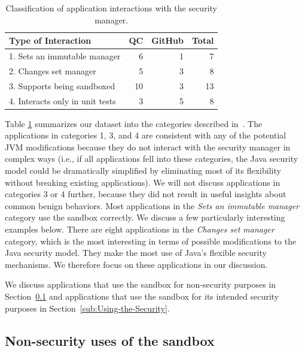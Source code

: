 \documentclass{sig-alternate-05-2015}
\begin{document}
\begin{table}
\caption{Classification of application
  interactions \label{tab:Classification-of-Application}
with the security manager.}
\begin{tabular}{lrrr}
\toprule 
Type of Interaction & QC & GitHub & Total\tabularnewline
\midrule
1. Sets an immutable manager & 6 & 1 & 7\tabularnewline
2. Changes set manager & 5 & 3 & 8\tabularnewline
3. Supports being sandboxed & 10 & 3 & 13\tabularnewline
4. Interacts only in unit tests & 3 & 5 & 8\tabularnewline
\bottomrule
\end{tabular}
\end{table}
Table \ref{tab:Classification-of-Application} summarizes our dataset into the categories described
in~. The applications in categories 1, 3, and 4 
are consistent with any of the potential JVM
modifications because they do not interact with the
security manager in complex ways (i.e., if all applications fell into these
categories, the Java security model could be dramatically simplified by
eliminating most of its flexibility without breaking existing
applications).   We will
not discuss applications in categories 3 or 4 further, because they did not
result in useful insights about common benign 
behaviors. Most applications in the \emph{Sets an immutable
  manager} category use the sandbox correctly.  We discuss a few particularly interesting examples below. 
%
There are eight applications in the \emph{Changes set manager} category, which
is the most interesting in terms of possible modifications to the Java security
model.  
They make the most use of Java's flexible security
mechanisms.  We therefore focus   
on these applications in our discussion. 

We discuss applications that use the sandbox for
non-security purposes in Section~\ref{sub:Non-security-uses-of}
and applications that use the sandbox for its intended security purposes in
Section~\ref{sub:Using-the-Security}.

\subsection{Non-security uses of the sandbox}\label{sub:Non-security-uses-of}
\end{document}
